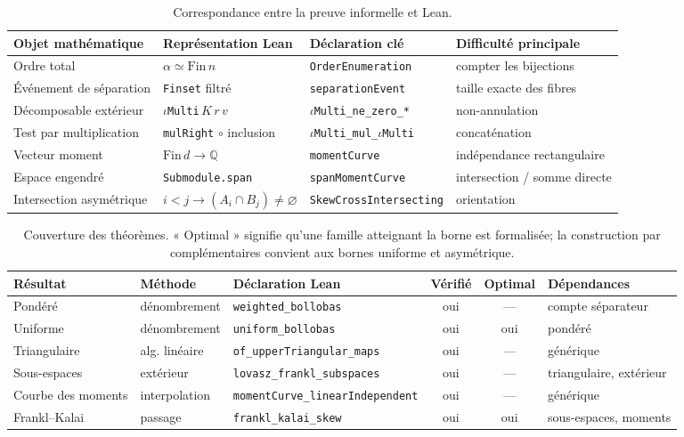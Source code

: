 \documentclass[11pt]{article}
\newcommand{\QQ}{\mathbb{Q}}
\begin{document}
\begin{table}[t]
\centering\scriptsize
\begin{tabular}{@{}llll@{}}
\toprule
Objet mathématique & Représentation Lean & Déclaration clé & Difficulté principale \\
\midrule
Ordre total & $\alpha\simeq\mathrm{Fin}\,n$ & \texttt{OrderEnumeration} & compter les bijections \\
Événement de séparation & \texttt{Finset} filtré & \texttt{separationEvent} & taille exacte des fibres \\
Décomposable extérieur & $\iota$\texttt{Multi}$\,K\,r\,v$ & \texttt{\(\iota\)Multi\_ne\_zero\_*} & non-annulation \\
Test par multiplication & \texttt{mulRight} $\circ$ inclusion & \texttt{\(\iota\)Multi\_mul\_\(\iota\)Multi} & concaténation \\
Vecteur moment & $\mathrm{Fin}\,d\to\QQ$ & \texttt{momentCurve} & indépendance rectangulaire \\
Espace engendré & \texttt{Submodule.span} & \texttt{spanMomentCurve} & intersection / somme directe \\
Intersection asymétrique & $i<j\to(A_i\cap B_j)\neq\varnothing$ & \texttt{SkewCrossIntersecting} & orientation \\
\bottomrule
\end{tabular}
\caption{Correspondance entre la preuve informelle et Lean.}
\label{tab:correspondence}
\end{table}

\begin{table}[t]
\centering\scriptsize
\begin{tabular}{@{}lllccl@{}}
\toprule
Résultat & Méthode & Déclaration Lean & Vérifié & Optimal & Dépendances \\
\midrule
Pondéré & dénombrement & \texttt{weighted\_bollobas} & oui & --- & compte séparateur \\
Uniforme & dénombrement & \texttt{uniform\_bollobas} & oui & oui & pondéré \\
Triangulaire & alg. linéaire & \texttt{of\_upperTriangular\_maps} & oui & --- & générique \\
Sous-espaces & extérieur & \texttt{lovasz\_frankl\_subspaces} & oui & --- & triangulaire, extérieur \\
Courbe des moments & interpolation & \texttt{momentCurve\_linearIndependent} & oui & --- & générique \\
Frankl--Kalai & passage & \texttt{frankl\_kalai\_skew} & oui & oui & sous-espaces, moments \\
\bottomrule
\end{tabular}
\caption{Couverture des théorèmes. « Optimal » signifie qu'une famille atteignant la
borne est formalisée; la construction par complémentaires convient aux bornes uniforme
et asymétrique.}
\label{tab:coverage}
\end{table}
\end{document}
